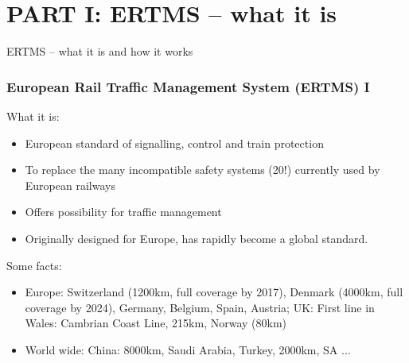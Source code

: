 \documentclass{beamer}
\begin{document}
\section{PART I: ERTMS -- what it is}

\begin{frame}
\begin{center}
{\Large ERTMS -- what it is and how it works}
\end{center}
\end{frame}



\begin{frame}

\frametitle{European Rail Traffic Management System (ERTMS) I}

What it is: 
\begin{itemize}

\item
European standard of signalling, control and train protection 

\item
To replace the many incompatible safety systems (20!) currently used by
European railways

\item 
Offers possibility for traffic management

\item Originally designed for Europe, has rapidly become a global standard.
\end{itemize}

\bigskip

Some facts:
\begin{itemize}
\item Europe: Switzerland (1200km, full coverage by 2017), Denmark (4000km, full coverage by 2024), Germany, Belgium, Spain, Austria;  UK: First line in Wales: Cambrian Coast Line, 215km, Norway (80km)
  \item World wide: China: 8000km, Saudi Arabia, Turkey, 2000km, SA ...



\end{itemize}




\end{frame}
\end{document}
